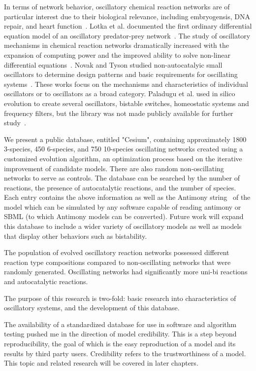 \documentclass[12pt]{report}
\begin{document}
In terms of network behavior, oscillatory chemical reaction networks are of particular interest due to their biological relevance, including embryogensis, DNA repair, and heart function~\cite{Novak2008,Aulehla2008,GevaZatorsky2006, Pol1928}. Lotka et al. documented the first ordinary differential equation model of an oscillatory predator-prey network~\cite{Lotka1910}. The study of oscillatory mechanisms in chemical reaction networks dramatically increased with the expansion of computing power and the improved ability to solve non-linear differential equations~\cite{Higgins1967}. Novak and Tyson studied non-autocatalyic small oscillators to determine design patterns and basic requirements for oscillating systems~\cite{Novak2008}. These works focus on the mechanisms and characteristics of individual oscillators or to oscillators as a broad category. Paladugu et al. used in silico evolution to create several oscillators, bistable switches, homeostatic systems and frequency filters, but the library was not made publicly available for further study~\cite{Paladugu2006}. 

We present a public database, entitled "Cesium",  containing approximately 1800 3-species, 450 6-species, and 750 10-species oscillating networks created using a customized evolution algorithm, an optimization process based on the iterative improvement of candidate models. There are also random non-oscillating networks to serve as controls. The database can be searched by the number of reactions, the presence of autocatalytic reactions, and the number of species. Each entry contains the above information as well as the Antimony string~\cite{Smith2009} of the model which can be simulated by any software capable of reading antimony or SBML (to which Antimony models can be converted). Future work will expand this database to include a wider variety of oscillatory models as well as models that display other behaviors such as bistability. 

The population of evolved oscillatory reaction networks possessed different reaction type compositions compared to non-oscillating networks that were randomly generated. Oscillating networks had significantly more uni-bi reactions and autocatalytic reactions. 


The purpose of this research is two-fold: basic research into characteristics of oscillatory systems, and the development of this database.

The availability of a standardized database for use in software and algorithm testing pushed me in the direction of model credibility. This is a step beyond reproducibility, the goal of which is the easy reproduction of a model and its results by third party users. Credibility refers to the trustworthiness of a model. This topic and related research will be covered in later chapters.
\end{document}
